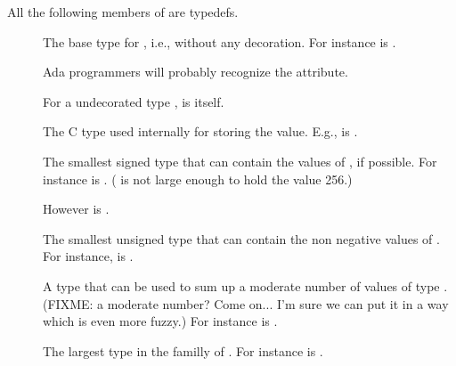 All the following members of  are typedefs.
\begin{description}
\item[] The base type for , i.e.,  without
any decoration.  For instance
is .

Ada programmers will probably recognize the  attribute.

For a undecorated type ,  is
 itself.

\item[] The C type used internally for storing the
value.  E.g.,  is
.


\item[]
The smallest signed type that can contain the values of , if possible.
For instance
 is .
( is not large enough to hold the value 256.)

However  is .

\item[]
The smallest unsigned type that can contain the non negative values of
.
For instance,
 is .

\item[]
A type that can be used to sum up a moderate number of values of type
.  (FIXME: a moderate number?  Come on...  I'm sure we can put
it in a way which is even more fuzzy.)
For instance
 is .

\item[]
The largest type in the familly of .  For instance
 is .


\end{description}
